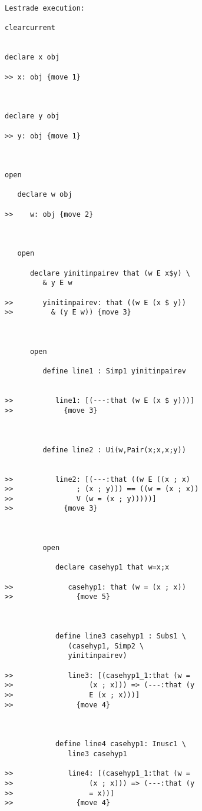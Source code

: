 \documentclass[12pt]{article}
\begin{document}
\begin{verbatim}Lestrade execution:

clearcurrent


declare x obj

>> x: obj {move 1}



declare y obj

>> y: obj {move 1}



open

   declare w obj

>>    w: obj {move 2}



   open

      declare yinitinpairev that (w E x$y) \
         & y E w

>>       yinitinpairev: that ((w E (x $ y))
>>         & (y E w)) {move 3}



      open

         define line1 : Simp1 yinitinpairev


>>          line1: [(---:that (w E (x $ y)))]
>>            {move 3}



         define line2 : Ui(w,Pair(x;x,x;y))


>>          line2: [(---:that ((w E ((x ; x)
>>               ; (x ; y))) == ((w = (x ; x))
>>               V (w = (x ; y)))))]
>>            {move 3}



         open

            declare casehyp1 that w=x;x

>>             casehyp1: that (w = (x ; x))
>>               {move 5}



            define line3 casehyp1 : Subs1 \
               (casehyp1, Simp2 \
               yinitinpairev)

>>             line3: [(casehyp1_1:that (w =
>>                  (x ; x))) => (---:that (y
>>                  E (x ; x)))]
>>               {move 4}



            define line4 casehyp1: Inusc1 \
               line3 casehyp1

>>             line4: [(casehyp1_1:that (w =
>>                  (x ; x))) => (---:that (y
>>                  = x))]
>>               {move 4}




\end{verbatim}
\end{document}
